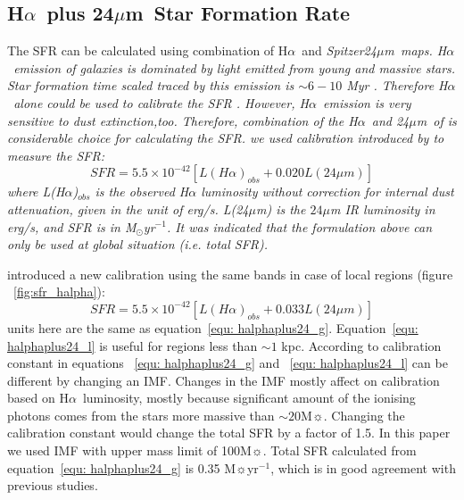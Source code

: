 \documentclass[useAMS,usenatbib]{mn2e}
\newcommand \halpha    {H$\alpha $\ }
\newcommand \um    {$\mu$m\ }
\newcommand \Spitzer {\it Spitzer}
\begin{document}
\subsection{\halpha plus 24\um Star Formation Rate}
\label{sec:sfr_halpha}

The SFR can be calculated using combination of \halpha and \Spitzer 24\um maps. \halpha emission of galaxies is dominated by light emitted from young and massive stars. Star formation time scaled traced by this emission is $\sim 6-10$ Myr \citep[e.g.,][]{Kennicutt09, Calzetti12}. Therefore \halpha alone could be used to calibrate the SFR \citep[e.g.,][]{Osterbrock06, Kennicutt09}. However, \halpha emission is very sensitive to dust extinction,too. Therefore, combination of the \halpha and 24\um of is considerable choice for calculating the SFR. we used calibration introduced by \cite{Kennicutt09} to measure the SFR:
\begin{equation}
\label{equ: halphaplus24_g}
SFR = 5.5 \times 10^{-42}[L(H{\alpha})_{obs} + 0.020L(24\mu m)]
\end{equation}
where L(H${\alpha}$)$_{obs}$ is the observed H${\alpha}$ luminosity without correction for internal dust attenuation, given in the unit of erg/s. L(24$\mu$m) is the $24\mu$m IR luminosity in erg/s, and SFR is in M$_{\odot}$yr$^{-1}$. It was indicated that the formulation above can only be used at global situation (i.e. total SFR).

\cite{Calzetti07} introduced a new calibration using the same bands in case of local regions (figure ~\ref{fig:sfr_halpha}):
\begin{equation}
\label{equ: halphaplus24_l}
SFR = 5.5 \times 10^{-42}[L(H{\alpha})_{obs} + 0.033L(24\mu m)]
\end{equation}
units here are the same as equation~\ref{equ: halphaplus24_g}. Equation~\ref{equ: halphaplus24_l} is useful for regions less than $\sim 1$ kpc. According to  \cite{Calzetti07} calibration constant in equations ~\ref{equ: halphaplus24_g} and ~\ref{equ: halphaplus24_l} can be different by changing an IMF. Changes in the IMF mostly affect on calibration based on \halpha luminosity, mostly because significant amount of the ionising photons comes from the stars more massive than $\sim 20$M$\sun$. Changing the calibration constant would change the total SFR by a factor of 1.5. In this paper we used \cite{Kroupa01} IMF with upper mass limit of 100M$\sun$. Total SFR calculated from equation~\ref{equ: halphaplus24_g} is 0.35  M$\sun$yr$^{-1}$, which is in good agreement with previous studies.
\end{document}
